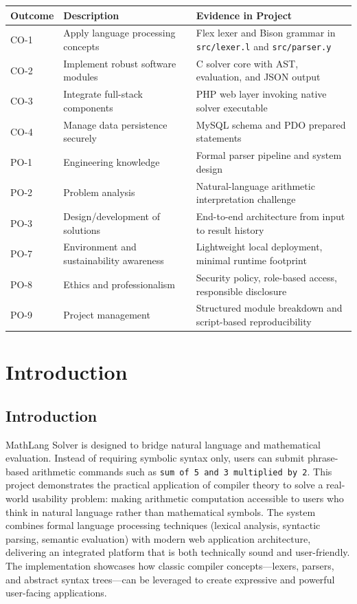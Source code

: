 \documentclass[12pt,a4paper]{report}
\begin{document}
\begin{longtable}{L{0.2\textwidth} L{0.34\textwidth} L{0.4\textwidth}}
\toprule
Outcome & Description & Evidence in Project \\
\midrule
CO-1 & Apply language processing concepts & Flex lexer and Bison grammar in \texttt{src/lexer.l} and \texttt{src/parser.y} \\
CO-2 & Implement robust software modules & C solver core with AST, evaluation, and JSON output \\
CO-3 & Integrate full-stack components & PHP web layer invoking native solver executable \\
CO-4 & Manage data persistence securely & MySQL schema and PDO prepared statements \\
PO-1 & Engineering knowledge & Formal parser pipeline and system design \\
PO-2 & Problem analysis & Natural-language arithmetic interpretation challenge \\
PO-3 & Design/development of solutions & End-to-end architecture from input to result history \\
PO-7 & Environment and sustainability awareness & Lightweight local deployment, minimal runtime footprint \\
PO-8 & Ethics and professionalism & Security policy, role-based access, responsible disclosure \\
PO-9 & Project management & Structured module breakdown and script-based reproducibility \\
\bottomrule
\end{longtable}

\tableofcontents
\clearpage
{}

\chapter{Introduction}

\section{Introduction}
MathLang Solver is designed to bridge natural language and mathematical evaluation.
Instead of requiring symbolic syntax only, users can submit phrase-based arithmetic commands
such as \texttt{sum of 5 and 3 multiplied by 2}. This project demonstrates the practical application of compiler
theory to solve a real-world usability problem: making arithmetic computation accessible to users who think in natural
language rather than mathematical symbols. The system combines formal language processing techniques (lexical analysis,
syntactic parsing, semantic evaluation) with modern web application architecture, delivering an integrated platform
that is both technically sound and user-friendly. The implementation showcases how classic compiler concepts—lexers, parsers,
and abstract syntax trees---can be leveraged to create expressive and powerful user-facing applications.
\end{document}
